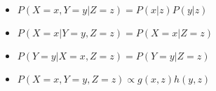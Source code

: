 \item
\begin{itemize}
  \item $P(X = x, Y = y|Z = z) = P(x|z)P(y|z)$

  \item $P(X = x|Y = y,Z = z) = P(X = x|Z = z)$

  \item $P(Y = y|X = x,Z = z) = P(Y = y|Z = z)$

  \item $P(X = x,Y = y,Z = z) \propto g(x,z)h(y,z)$

\end{itemize}
